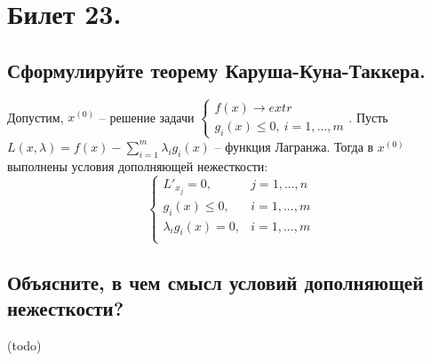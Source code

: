 \section{Билет 23.}

\subsection{Сформулируйте теорему Каруша-Куна-Таккера.}
\begin{theorem}
    Допустим, $x^{(0)}$ -- решение задачи $\begin{cases}
        f(x) \to extr \\
        g_i(x) \leqslant 0, \> i = 1,...,m
    \end{cases}$. Пусть $L(x, \lambda) = f(x) - \sum_{i=1}^{m} \lambda_i g_i(x)$ -- функция Лагранжа. Тогда в $x^{(0)}$ выполнены условия дополняющей нежесткости:
    \[
        \begin{cases}
            L'_{x_j} = 0, & j = 1, ..., n \\
            g_i(x) \leqslant 0, & i = 1, ..., m \\
            \lambda_i g_i(x) = 0, & i = 1, ..., m \\
        \end{cases}
    \]
\end{theorem}

\subsection{Объясните, в чем смысл условий дополняющей нежесткости?}
(todo)